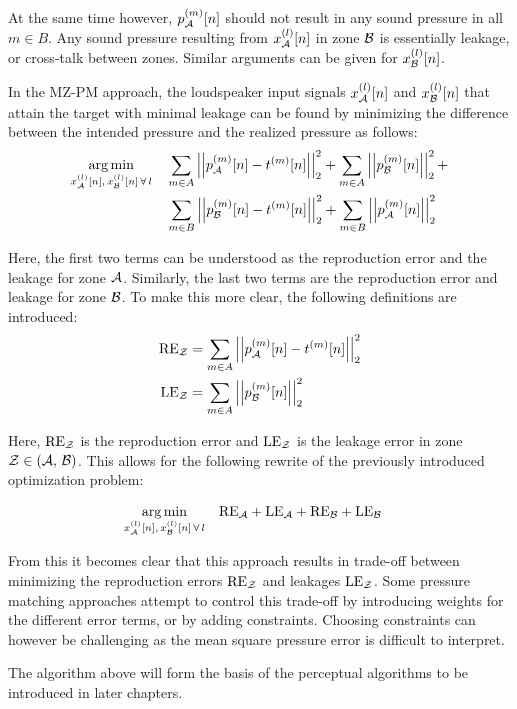 At the same time however, $p_{\mathcal{A}}^{(m)}[n]$ should not result in any sound pressure in all $m \in B$.
Any sound pressure resulting from $x_{\mathcal{A}}^{(l)}[n]$ in zone $\mathcal{B}$ is essentially leakage, or cross-talk between zones. 
Similar arguments can be given for $x_{\mathcal{B}}^{(l)}[n]$.

In the MZ-PM approach, the loudspeaker input signals $x_{\mathcal{A}}^{(l)}[n]$ and $x_{\mathcal{B}}^{(l)}[n]$ that attain the target with minimal leakage can be found by 
minimizing the difference between the intended pressure and the realized pressure as follows:
\begin{align}
    \argmin{x_\za^{(l)}[n],\,x_\zb^{(l)}[n]\,\forall\,l}{
       &\sum_{m\in A} \norm[2][2]{p_\za^{(m)}[n] - t^{(m)}[n]} +
        \sum_{m\in A} \norm[2][2]{p_\zb^{(m)}[n]} + \\
       &\sum_{m\in B} \norm[2][2]{p_\zb^{(m)}[n] - t^{(m)}[n]} + 
        \sum_{m\in B} \norm[2][2]{p_\za^{(m)}[n]}
    }
\end{align}

Here, the first two terms can be understood as the reproduction error and the leakage for zone $\mathcal{A}$.
Similarly, the last two terms are the reproduction error and leakage for zone $\mathcal{B}$. 
To make this more clear, the following definitions are introduced:
\begin{align}
    \text{RE}_\zz &= \sum_{m\in A} \norm[2][2]{p_\za^{(m)}[n] - t^{(m)}[n]} \\
    \text{LE}_\zz &= \sum_{m\in A} \norm[2][2]{p_\zb^{(m)}[n]} 
\end{align}

Here, $\text{RE}_{\mathcal{Z}}$ is the reproduction error and $\text{LE}_{\mathcal{Z}}$ is the leakage error in zone $\mathcal{Z} \in \left(\mathcal{A},\,\mathcal{B}\right)$.
This allows for the following rewrite of the previously introduced optimization problem:

\begin{align}
    \argmin{x_\za^{(l)}[n],\,x_\zb^{(l)}[n]\,\forall\,l}{
       &\text{RE}_\za + \text{LE}_\za + \text{RE}_\zb + \text{LE}_\zb
    }
\end{align}

From this it becomes clear that this approach results in trade-off between minimizing the reproduction errors $\text{RE}_{\mathcal{Z}}$ 
and leakages $\text{LE}_{\mathcal{Z}}$. 
Some pressure matching approaches attempt to control this trade-off by introducing weights for the different error terms, 
or by adding constraints.
Choosing constraints can however be challenging as the mean square pressure error is difficult to interpret.

The algorithm above will form the basis of the perceptual algorithms to be introduced in later chapters.
